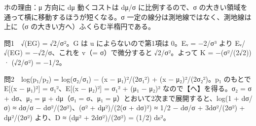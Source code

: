 \documentclass[
  10pt,
  a4paper,
]{article}
\begin{document}
ホの理由：μ 方向に dμ 動くコストは dμ/σ に比例するので、σ
の大きい領域を通って横に移動するほうが短くなる。σ
一定の線分は測地線ではなく、測地線は上に（σ
の大きい方へ）ふくらむ半楕円である。

問1　√(EG) = √2/σ²。G は u によらないので第1項は 0。E{\fallbackfont ᵥ} =
−2/σ³ より E{\fallbackfont ᵥ}/√(EG) = −√2/σ、これを v（= σ）で微分すると
√2/σ²。よって K = −(σ²/(2√2)) · (√2/σ²) = −1/2。

問2　log(p{\fallbackfont ₁}/p{\fallbackfont ₂}) =
log(σ{\fallbackfont ₂}/σ{\fallbackfont ₁}) − (x −
μ{\fallbackfont ₁})²/(2σ{\fallbackfont ₁}²) + (x −
μ{\fallbackfont ₂})²/(2σ{\fallbackfont ₂}²)。p{\fallbackfont ₁} のもとで
E{[}(x − μ{\fallbackfont ₁})²{]} = σ{\fallbackfont ₁}²、E{[}(x −
μ{\fallbackfont ₂})²{]} = σ{\fallbackfont ₁}² + (μ{\fallbackfont ₁} −
μ{\fallbackfont ₂})² なので【ヘ】を得る。σ{\fallbackfont ₂} = σ +
dσ、μ{\fallbackfont ₂} = μ + dμ（σ{\fallbackfont ₁} =
σ、μ{\fallbackfont ₁} = μ）とおいて2次まで展開すると、log(1 + dσ/σ) ≈
dσ/σ − dσ²/(2σ²)、(σ² + dμ²)/(2(σ + dσ)²) ≈ 1/2 − dσ/σ + 3dσ²/(2σ²) +
dμ²/(2σ²) より、D ≈ (dμ² + 2dσ²)/(2σ²) = (1/2) ds²。
\end{document}
